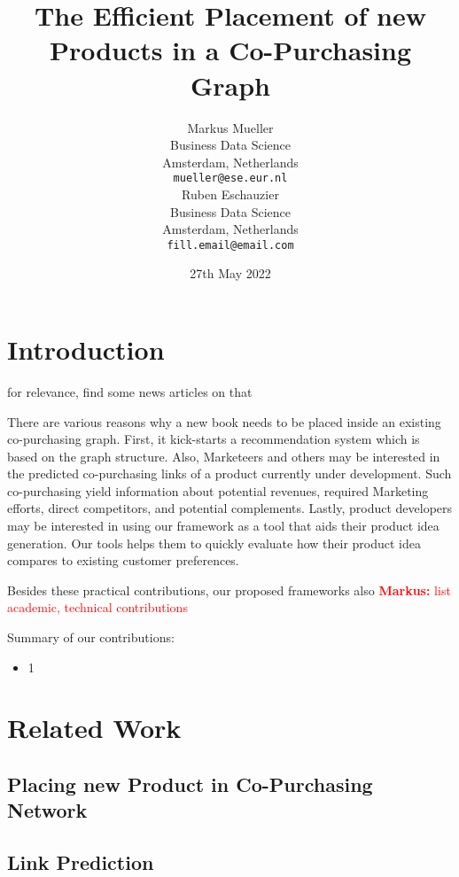 \documentclass[a4paper]{article} %
\title{The Efficient Placement of new Products in a Co-Purchasing Graph}
\author{%
  Markus Mueller \\
  Business Data Science \\
  Amsterdam, Netherlands \\
  \texttt{mueller@ese.eur.nl}\\
  \And
  Ruben Eschauzier \\
  Business Data Science \\
  Amsterdam, Netherlands \\
  \texttt{fill.email@email.com}
\date{27th May 2022}
}
\newcommand{\MM}[1]{\textcolor{red}{\textbf{Markus:} #1}}
\begin{document}
\maketitle

\begin{abstract}

\end{abstract}

\section{Introduction}

for relevance, find some news articles on that


There are various reasons why a new book needs to be placed inside an existing co-purchasing graph. First, it kick-starts a recommendation system which is based on the graph structure. Also, Marketeers and others may be interested in the predicted co-purchasing links of a product currently under development. Such co-purchasing yield information about potential revenues, required Marketing efforts, direct competitors, and potential complements. Lastly, product developers may be interested in using our framework as a tool that aids their product idea generation. Our tools helps them to quickly evaluate how their product idea compares to existing customer preferences. 

Besides these practical contributions, our proposed frameworks also \MM{list academic, technical contributions}


Summary of our contributions:
\begin{itemize}
    \item 1
\end{itemize}

\section{Related Work}



\subsection{Placing new Product in Co-Purchasing Network}

\subsection{Link Prediction}

\citet{ahmed2021}
\end{document}
